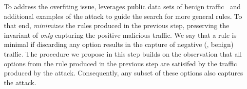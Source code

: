 \documentclass[conference]{IEEEtran}
\begin{document}

To address the overfiting issue, \tname{} leverages public data sets
of benign traffic~\cite{tcpreplay} and additional examples of the
attack to guide the search for more general rules. To that end,
\tname{} \emph{minimizes} the rules produced in the previous step,
preserving the invariant of \emph{only} capturing the positive
malicious traffic. We say that a rule is minimal if discarding any
option results in the capture of negative (\ie{}, benign) traffic.
The procedure we propose in this step builds on the observation that
all options from the rule produced in the previous step are satisifed
by the traffic produced by the attack. Consequently, any subset of
these options also captures the attack.
\end{document}
